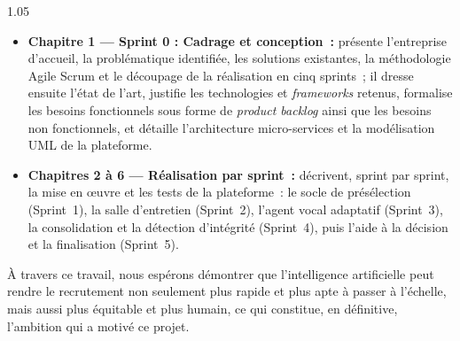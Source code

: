 \begin{spacing}{1.05}
\begin{itemize}[noitemsep, topsep=2pt]
  \item \textbf{Chapitre 1 — Sprint 0 : Cadrage et conception~:} présente l'entreprise
        d'accueil, la problématique identifiée, les solutions existantes, la méthodologie
        Agile Scrum et le découpage de la réalisation en cinq sprints~; il dresse ensuite l'état
        de l'art, justifie les technologies et \textit{frameworks} retenus, formalise les besoins
        fonctionnels sous forme de \textit{product backlog} ainsi que les besoins non fonctionnels,
        et détaille l'architecture micro-services et la modélisation UML de la plateforme.
  \item \textbf{Chapitres 2 à 6 — Réalisation par sprint~:} décrivent, sprint par sprint, la
        mise en œuvre et les tests de la plateforme~: le socle de présélection (Sprint~1), la
        salle d'entretien (Sprint~2), l'agent vocal adaptatif (Sprint~3), la consolidation et
        la détection d'intégrité (Sprint~4), puis l'aide à la décision et la finalisation
        (Sprint~5).
\end{itemize}

\noindent À travers ce travail, nous espérons démontrer que l'intelligence artificielle peut
rendre le recrutement non seulement plus rapide et plus apte à passer à l'échelle, mais aussi plus équitable
et plus humain, ce qui constitue, en définitive, l'ambition qui a motivé ce projet.
\end{spacing}
